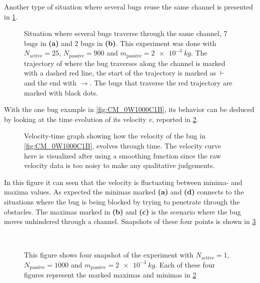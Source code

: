 Another type of situation where several bugs reuse the same channel is presented in \cref{fig:CM_0W900C25B}.

\begin{figure}[htpb!]
\centering
{}\quad
{}
\caption{Situation where several bugs traverse through the same channel, 
7 bugs in \textbf{(a)} and 2 bugs in \textbf{(b)}.
This experiment was done with $N_{\text{active}}=25$, $N_{\text{passive}}=900$ and 
$m_{\text{passive}}=\SI{2e-3}{kg}$. The trajectory of where the bug traverses along the 
channel is marked with a dashed red line, the start of the trajectory is marked as $\vdash$ and the 
end with $\rightarrow$. The bugs that traverse the red trajectory are marked with black dots.} 
\label{fig:CM_0W900C25B}
\end{figure}


With the one bug example in \cref{fig:CM_0W1000C1B}, its behavior can be deduced by looking at the time 
evolution of its velocity $v$, reported in \cref{fig:CM_0W1000C1B_vt}.

\begin{figure}[htbp!]
\centering
{}
\caption{Velocity-time graph showing how the velocity of the bug in \cref{fig:CM_0W1000C1B}, evolves through time. 
 The velocity curve here is visualized after using a smoothing function since the raw velocity 
 data is too noisy to make any qualitative judgements.} 
\label{fig:CM_0W1000C1B_vt}
\end{figure}

In this figure it can seen that the velocity is fluctuating between minima- and maxima values. 
As expected the minimas marked  \textbf{(a)} and \textbf{(d)} connects to the situations 
where the bug is being blocked by trying to penetrate through the obstacles. The maximas marked in 
\textbf{(b)} and \textbf{(c)} is the scenario where the bug moves unhindered through a channel. 
Snapshots of these four points is shown in \cref{fig:0W1000C1B_vt_refer}

\begin{figure}[htbp!]
\centering
{}\quad
{}\\
\quad
{}
\caption{This figure shows four snapshot of the experiment with
$N_{\text{active}}=1$, $N_{\text{passive}}=1000$ and 
$m_{\text{passive}}=\SI{2e-3}{kg}$. Each of these four figures represent the marked 
maximas and minimas in \cref{fig:CM_0W1000C1B_vt}} 
\label{fig:0W1000C1B_vt_refer}
\end{figure}

